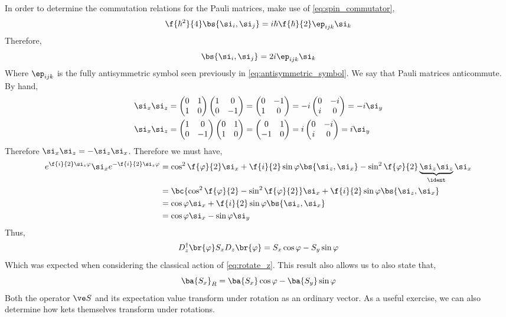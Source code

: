 \documentclass{article}
\begin{document}
In order to determine the commutation relations for the Pauli matrices, make use of \cref{eq:spin_commutator},
\[ \f{\hbar^2}{4}\bs{\si_i, \si_j} = i \hbar \f{\hbar}{2} \ep_{ijk} \si_k \]
Therefore,
\[ \bs{\si_i, \si_j} = 2i\ep_{ijk} \si_k \]
Where $\ep_{ijk}$ is the fully antisymmetric symbol seen previously in \cref{eq:antisymmetric_symbol}. We say that Pauli matrices anticommute. By hand,
\begin{align*}
\si_x \si_z &= \begin{pmatrix}0 & 1 \\ 1 & 0 \end{pmatrix}\begin{pmatrix}1 & 0 \\ 0 & -1 \end{pmatrix} = \begin{pmatrix}0 & -1 \\ 1 & 0 \end{pmatrix} = -i\begin{pmatrix}0 & -i \\ i & 0 \end{pmatrix} = -i \si_y \\
\si_x \si_z &= \begin{pmatrix}1 & 0 \\ 0 & -1 \end{pmatrix}\begin{pmatrix}0 & 1 \\ 1 & 0 \end{pmatrix} = \begin{pmatrix}0 & 1 \\ -1 & 0 \end{pmatrix} = i\begin{pmatrix}0 & -i \\ i & 0 \end{pmatrix} = i \si_y
\end{align*}
Therefore $\si_x \si_z = - \si_z \si_x$. Therefore we must have,
\begin{align*}
    e^{\f{i}{2} \si_z \varphi } \si_x e^{-\f{i}{2} \si_z \varphi }
    &= \cos^2 \f{\varphi}{2} \si_x + \f{i}{2} \sin \varphi \bs{\si_z, \si_x}- \sin^2 \f{\varphi}{2} \underbrace{\si_z \si_z}_{\ident} \si_x  \\
    &= \bc{\cos^2 \f{\varphi}{2} - \sin^2 \f{\varphi}{2}} \si_x + \f{i}{2} \sin \varphi \bs{\si_z, \si_x} \\
    &= \cos \varphi \si_x + \f{i}{2} \sin \varphi \bs{\si_z, \si_x} \\
    &= \cos \varphi \si_x - \sin \varphi \si_y
\end{align*}
Thus,
\[ D^{\dagger}_z\br{\varphi} S_x D_z\br{\varphi} = S_x \cos \varphi - S_y \sin \varphi \]
Which was expected when considering the classical action of \cref{eq:rotate_z}. This result also allows us to also state that,
\[ \ba{S_x}_R = \ba{S_x} \cos \varphi - \ba{S_y} \sin \varphi \]
Both the operator $\ve S$ and its expectation value transform under rotation as an ordinary vector. As a useful exercise, we can also determine how kets themselves transform under rotations.
\end{document}
